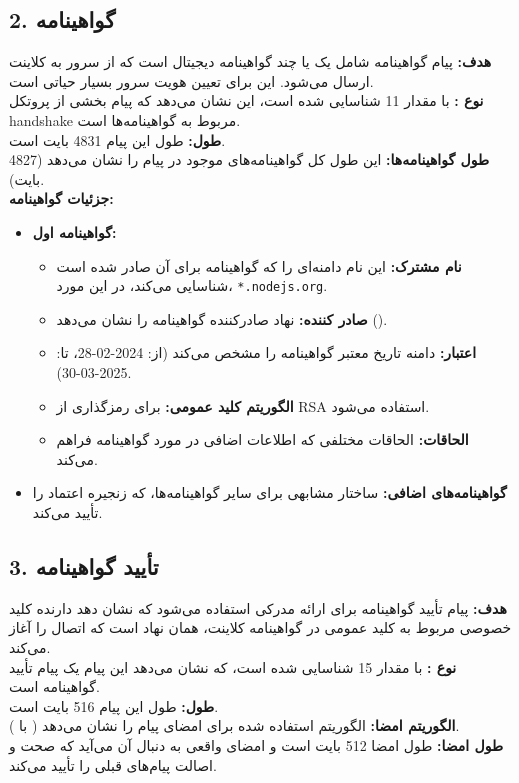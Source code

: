 \subsection*{2. گواهینامه}
\textbf{هدف:} پیام گواهینامه شامل یک یا چند گواهینامه دیجیتال است که از سرور به کلاینت ارسال می‌شود. این برای تعیین هویت سرور بسیار حیاتی است.\\
\textbf{نوع :} با مقدار 11 شناسایی شده است، این نشان می‌دهد که پیام بخشی از پروتکل handshake مربوط به گواهینامه‌ها است.\\
\textbf{طول:} طول این پیام 4831 بایت است.\\
\textbf{طول گواهینامه‌ها:} این طول کل گواهینامه‌های موجود در پیام را نشان می‌دهد (4827 بایت).\\
\textbf{جزئیات گواهینامه:}
\begin{itemize}
    \item \textbf{گواهینامه اول:}
        \begin{itemize}
            \item \textbf{نام مشترک:} این نام دامنه‌ای را که گواهینامه برای آن صادر شده است شناسایی می‌کند، در این مورد، \texttt{*.nodejs.org}.
            \item \textbf{صادر کننده:} نهاد صادرکننده گواهینامه را نشان می‌دهد ().
            \item \textbf{اعتبار:} دامنه تاریخ معتبر گواهینامه را مشخص می‌کند (از: 2024-02-28، تا: 2025-03-30).
            \item \textbf{الگوریتم کلید عمومی:} برای رمزگذاری از RSA استفاده می‌شود.
            \item \textbf{الحاقات:} الحاقات مختلفی که اطلاعات اضافی در مورد گواهینامه فراهم می‌کند.
        \end{itemize}
    \item \textbf{گواهینامه‌های اضافی:} ساختار مشابهی برای سایر گواهینامه‌ها، که زنجیره اعتماد را تأیید می‌کند.
\end{itemize}

\subsection*{3. تأیید گواهینامه}
\textbf{هدف:} پیام تأیید گواهینامه برای ارائه مدرکی استفاده می‌شود که نشان دهد دارنده کلید خصوصی مربوط به کلید عمومی در گواهینامه کلاینت، همان نهاد است که اتصال را آغاز می‌کند.\\
\textbf{نوع :} با مقدار 15 شناسایی شده است، که نشان می‌دهد این پیام یک پیام تأیید گواهینامه است.\\
\textbf{طول:} طول این پیام 516 بایت است.\\
\textbf{الگوریتم امضا:} الگوریتم استفاده شده برای امضای پیام را نشان می‌دهد ( با ).\\
\textbf{طول امضا:} طول امضا 512 بایت است و امضای واقعی به دنبال آن می‌آید که صحت و اصالت پیام‌های قبلی را تأیید می‌کند.


